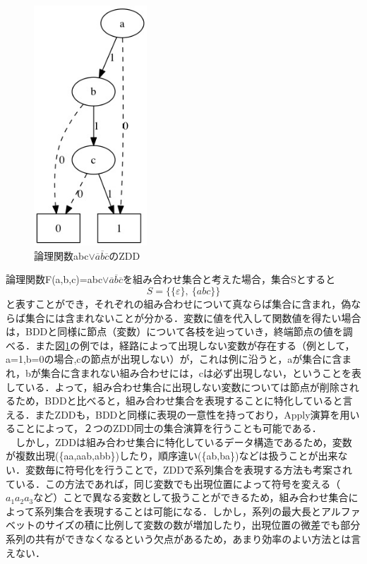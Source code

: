 \documentclass[12pt,twoside, fleqn]{ujbook}
\begin{document}
	\begin{figure}[htbp]
	\begin{center}
		\includegraphics [clip, height=9cm]{./img/zdd_sample.jpeg}
		\caption{論理関数abc$\lor\overline{a}\overline{b}\overline{c}$のZDD}
		\label{fig:zdd_sample}
	\end{center}
	\end{figure}


	論理関数F(a,b,c)=abc$\lor\overline{a}\overline{b}\overline{c}$を組み合わせ集合と考えた場合，集合Sとすると
	$$
	S=\{\{\varepsilon\},\ \{abc\}\}
	$$
	と表すことができ，それぞれの組み合わせについて真ならば集合に含まれ，偽ならば集合には含まれないことが分かる．変数に値を代入して関数値を得たい場合は，BDDと同様に節点（変数）について各枝を辿っていき，終端節点の値を調べる．また図\ref{fig:zdd_sample}の例では，経路によって出現しない変数が存在する（例として，a=1,b=0の場合,cの節点が出現しない）が，これは例に沿うと，aが集合に含まれ，bが集合に含まれない組み合わせには，cは必ず出現しない，ということを表している．よって，組み合わせ集合に出現しない変数については節点が削除されるため，BDDと比べると，組み合わせ集合を表現することに特化していると言える．またZDDも，BDDと同様に表現の一意性を持っており，Apply演算\cite{bryant86}を用いることによって，２つのZDD同士の集合演算を行うことも可能である．\\
	　しかし，ZDDは組み合わせ集合に特化しているデータ構造であるため，変数が複数出現(\{aa,aab,abb\})したり，順序違い(\{ab,ba\})などは扱うことが出来ない．変数毎に符号化を行うことで，ZDDで系列集合を表現する方法\cite{conf/jsai/KuraiMZ06}も考案されている．この方法であれば，同じ変数でも出現位置によって符号を変える（$a_{1}a_{2}a_{3}など$）ことで異なる変数として扱うことができるため，組み合わせ集合によって系列集合を表現することは可能になる．しかし，系列の最大長とアルファベットのサイズの積に比例して変数の数が増加したり，出現位置の微差でも部分系列の共有ができなくなる\cite{minato:recently-bdd}という欠点があるため，あまり効率のよい方法とは言えない．
\end{document}
